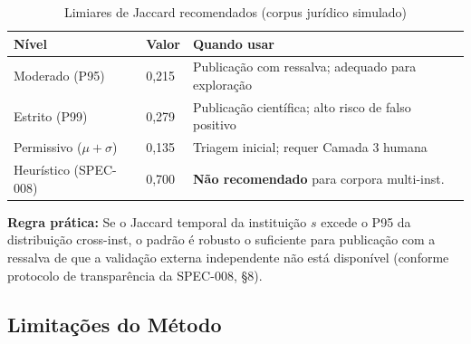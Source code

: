 \documentclass[12pt,a4paper]{article}
\theoremstyle{remark}
\begin{document}
\begin{table}[H]\centering\footnotesize
\caption{Limiares de Jaccard recomendados (corpus jurídico simulado)}
\label{tab:limiares_final}
\begin{tabular}{p{}p{}p{}}
\toprule
\textbf{Nível} & \textbf{Valor} & \textbf{Quando usar} \\
\midrule
Moderado (P95) & 0,215 & Publicação com ressalva; adequado para exploração \\
Estrito (P99) & 0,279 & Publicação científica; alto risco de falso positivo \\
Permissivo ($\mu+\sigma$) & 0,135 & Triagem inicial; requer Camada 3 humana \\
Heurístico (SPEC-008) & 0,700 & \textbf{Não recomendado} para corpora multi-inst. \\
\bottomrule
\end{tabular}
\end{table}

\textbf{Regra prática:} Se o Jaccard temporal da instituição $s$ excede o P95 da distribuição cross-inst, o padrão é robusto o suficiente para publicação com a ressalva de que a validação externa independente não está disponível (conforme protocolo de transparência da SPEC-008, §8).

\subsection{Limitações do Método}
\end{document}
